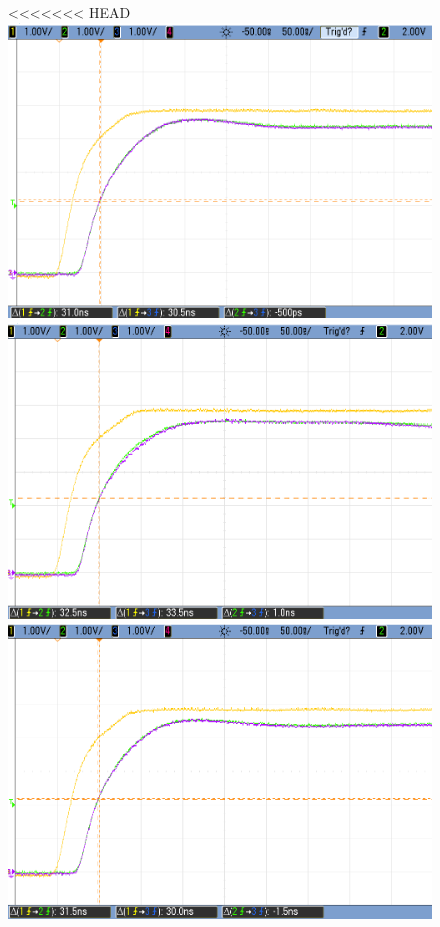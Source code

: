 \begin{figure}[H]
    \begin{center}
<<<<<<< HEAD
        \includegraphics[scale=0.3]{../Exercise1/Moore/report/images/e3e1_1.png}\\
        \includegraphics[scale=0.3]{../Exercise1/Moore/report/images/e3e1_1k.png}\\
        \includegraphics[scale=0.3]{../Exercise1/Moore/report/images/e3e1_100k_.png}

\end{center}
\end{figure}
